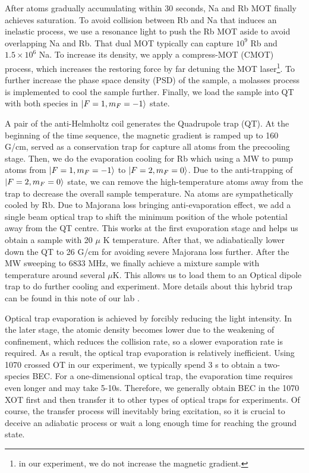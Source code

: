 After atoms gradually accumulating within 30 seconds, Na and Rb MOT finally achieves saturation. To avoid collision between Rb and Na that induces an inelastic process, we use a resonance light to push the Rb MOT aside to avoid overlapping Na and Rb. That dual MOT typically can capture $10^{9}$ Rb and $1.5 \times 10^{6}$ Na. To increase its density, we apply a compress-MOT (CMOT) process, which increases the restoring force by far detuning the MOT laser\footnote{in our experiment, we do not increase the magnetic gradient.}. To further increase the phase space density (PSD) of the sample, a molasses process is implemented to cool the sample further. Finally, we load the sample into QT with both species in $\ket{F=1,m_F=-1}$ state.

A pair of the anti-Helmholtz coil generates the Quadrupole trap (QT). At the beginning of the time sequence, the magnetic gradient is ramped up to 160 G/cm, served as a conservation trap for capture all atoms from the precooling stage. Then, we do the evaporation cooling for Rb which using a MW to pump atoms from $\ket{F=1,m_F=-1}$ to $\ket{F=2,m_F=0}$. Due to the anti-trapping of $\ket{F=2,m_F=0}$ state, we can remove the high-temperature atoms away from the trap to decrease the overall sample temperature. Na atoms are sympathetically cooled by Rb. Due to Majorana loss bringing anti-evaporation effect, we add a single beam optical trap to shift the minimum position of the whole potential away from the QT centre. This works at the first evaporation stage and helps us obtain a sample with 20 $\mu$ K temperature. After that, we adiabatically lower down the QT to 26 G/cm for avoiding severe Majorana loss further. After the MW sweeping to 6833 MHz, we finally achieve a mixture sample with temperature around several $\mu$K. This allows us to load them to an Optical dipole trap to do further cooling and experiment. More details about this hybrid trap can be found in this note of our lab \cite{xiong2013production}.

Optical trap evaporation is achieved by forcibly reducing the light intensity. In the later stage, the atomic density becomes lower due to the weakening of confinement, which reduces the collision rate, so a slower evaporation rate is required. As a result, the optical trap evaporation is relatively inefficient. Using 1070 crossed OT in our experiment, we typically spend 3 s to obtain a two-species BEC. For a one-dimensional optical trap, the evaporation time requires even longer and may take 5-10s. Therefore, we generally obtain BEC in the 1070 XOT first and then transfer it to other types of optical traps for experiments. Of course, the transfer process will inevitably bring excitation, so it is crucial to deceive an adiabatic process or wait a long enough time for reaching the ground state.

